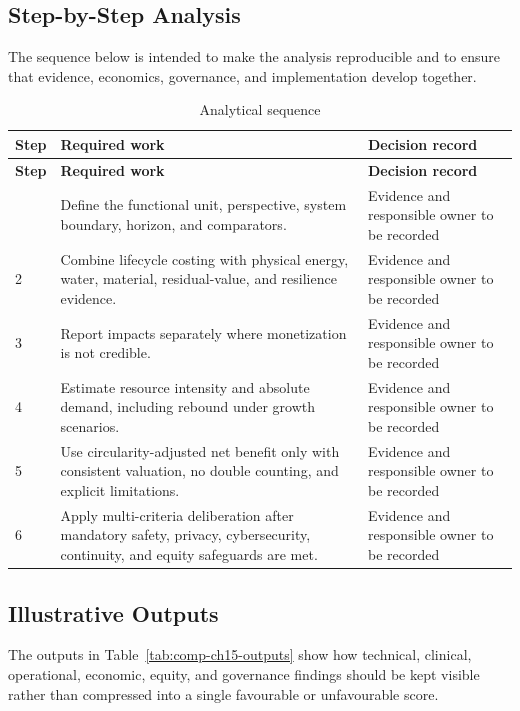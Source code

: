 \subsection{Step-by-Step Analysis}
The sequence below is intended to make the analysis reproducible and to ensure
that evidence, economics, governance, and implementation develop together.

\begin{longtable}{@{}p{}p{}p{}@{}}
\caption{Analytical sequence}
\label{tab:comp-ch15-analysis-steps}\\
\toprule
\textbf{Step} & \textbf{Required work} & \textbf{Decision record} \\
\midrule
\endfirsthead
\toprule
\textbf{Step} & \textbf{Required work} & \textbf{Decision record} \\
\midrule
\endhead
\bottomrule
\endlastfoot
1 & Define the functional unit, perspective, system boundary, horizon, and comparators. & Evidence and responsible owner to be recorded \\
2 & Combine lifecycle costing with physical energy, water, material, residual-value, and resilience evidence. & Evidence and responsible owner to be recorded \\
3 & Report impacts separately where monetization is not credible. & Evidence and responsible owner to be recorded \\
4 & Estimate resource intensity and absolute demand, including rebound under growth scenarios. & Evidence and responsible owner to be recorded \\
5 & Use circularity-adjusted net benefit only with consistent valuation, no double counting, and explicit limitations. & Evidence and responsible owner to be recorded \\
6 & Apply multi-criteria deliberation after mandatory safety, privacy, cybersecurity, continuity, and equity safeguards are met. & Evidence and responsible owner to be recorded \\
\end{longtable}

\subsection{Illustrative Outputs}
The outputs in Table~\ref{tab:comp-ch15-outputs} show how technical,
clinical, operational, economic, equity, and governance findings should be kept
visible rather than compressed into a single favourable or unfavourable score.

